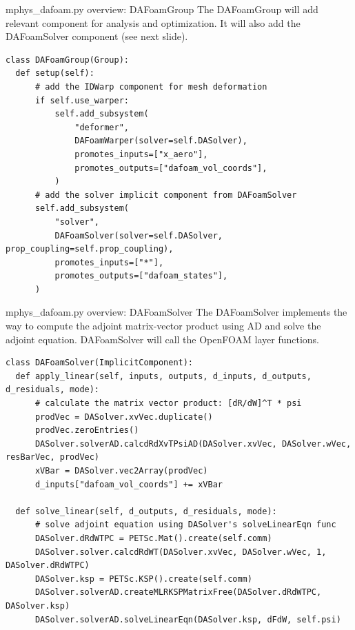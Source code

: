 \documentclass{bredelebeamer}
\begin{document}
\begin{frame}[fragile]{mphys\_dafoam.py overview: DAFoamGroup}
The DAFoamGroup will add relevant component for analysis and optimization. It will also add the DAFoamSolver component (see next slide).
\footnotesize
\lstset{ language=python }
\begin{lstlisting}
class DAFoamGroup(Group):
  def setup(self):
      # add the IDWarp component for mesh deformation
      if self.use_warper:
          self.add_subsystem(
              "deformer",
              DAFoamWarper(solver=self.DASolver),
              promotes_inputs=["x_aero"],
              promotes_outputs=["dafoam_vol_coords"],
          )
      # add the solver implicit component from DAFoamSolver
      self.add_subsystem(
          "solver",
          DAFoamSolver(solver=self.DASolver, prop_coupling=self.prop_coupling),
          promotes_inputs=["*"],
          promotes_outputs=["dafoam_states"],
      )

\end{lstlisting}
\normalsize

\end{frame}


\begin{frame}[fragile]{mphys\_dafoam.py overview: DAFoamSolver}
The DAFoamSolver implements the way to compute the adjoint matrix-vector product using AD and solve the adjoint equation. DAFoamSolver will call the OpenFOAM layer functions.
\footnotesize
\lstset{ language=python }
\begin{lstlisting}
class DAFoamSolver(ImplicitComponent):
  def apply_linear(self, inputs, outputs, d_inputs, d_outputs, d_residuals, mode):
      # calculate the matrix vector product: [dR/dW]^T * psi
      prodVec = DASolver.xvVec.duplicate()
      prodVec.zeroEntries()
      DASolver.solverAD.calcdRdXvTPsiAD(DASolver.xvVec, DASolver.wVec, resBarVec, prodVec)
      xVBar = DASolver.vec2Array(prodVec)
      d_inputs["dafoam_vol_coords"] += xVBar

  def solve_linear(self, d_outputs, d_residuals, mode):
      # solve adjoint equation using DASolver's solveLinearEqn func
      DASolver.dRdWTPC = PETSc.Mat().create(self.comm)
      DASolver.solver.calcdRdWT(DASolver.xvVec, DASolver.wVec, 1, DASolver.dRdWTPC)
      DASolver.ksp = PETSc.KSP().create(self.comm)
      DASolver.solverAD.createMLRKSPMatrixFree(DASolver.dRdWTPC, DASolver.ksp)
      DASolver.solverAD.solveLinearEqn(DASolver.ksp, dFdW, self.psi)

\end{lstlisting}
\normalsize

\end{frame}
\end{document}

